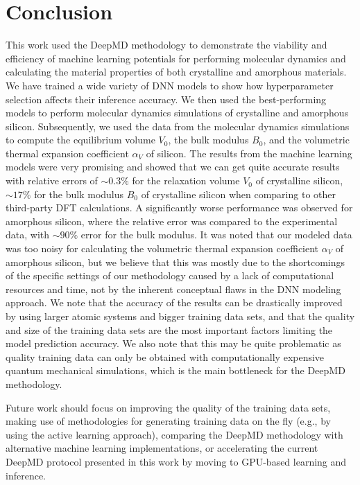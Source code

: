 \chapter{Conclusion}

This work used the DeepMD methodology to demonstrate the viability and
efficiency of machine learning potentials for performing molecular dynamics
and calculating the material properties of both crystalline and amorphous
materials. We have trained a wide variety of DNN models to show how
hyperparameter selection affects their inference accuracy. We then used the
best-performing models to perform molecular dynamics simulations of crystalline and amorphous silicon. Subsequently, we
used the data from the molecular dynamics simulations to compute the
equilibrium volume $V_0$, the bulk modulus $B_0$, and the volumetric thermal
expansion coefficient $\alpha_V$ of silicon. The results from the machine
learning models were very promising and showed that we can get quite accurate
results with relative errors of $\sim 0.3\%$ for the relaxation volume $V_0$
of crystalline silicon, $\sim 17 \%$ for the bulk modulus $B_0$ of crystalline
silicon when comparing to other third-party DFT calculations. A significantly
worse performance was observed for amorphous silicon, where the relative error
was compared to the experimental data, with $\sim 90 \%$ error for the bulk modulus.
It was noted that our modeled data was too noisy for calculating the volumetric
thermal expansion coefficient $\alpha_V$ of amorphous silicon, but we believe that this
was mostly due to the shortcomings of the specific settings of our methodology
caused by a lack of computational resources and time, not by the inherent conceptual flaws in
the DNN modeling approach. We note that the accuracy of the results can be
drastically improved by using larger atomic systems and bigger training data sets,
and that the quality and size of the training data sets are the most important factors limiting the
model prediction accuracy. We also note that this may be quite problematic as
quality training data can only be obtained with computationally expensive
quantum mechanical simulations, which is the main bottleneck for the DeepMD
methodology.

Future work should focus on improving the quality of the training data sets,
making use of methodologies for generating training data on the fly (e.g., by
using the active learning approach), comparing the DeepMD methodology with
alternative machine learning implementations, or accelerating the current DeepMD
protocol presented in this work by moving to GPU-based learning and inference.
